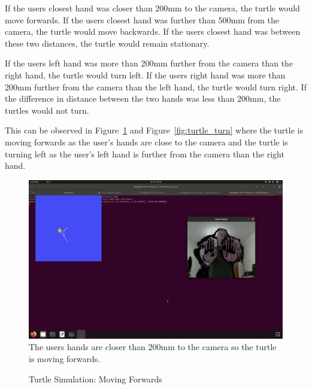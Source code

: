 If the users closest hand was closer than 200mm to the camera, the turtle would move forwards.\newline
If the users closest hand was further than 500mm from the camera, the turtle would move backwards.\newline
If the users closest hand was between these two distances, the turtle would remain stationary.

If the users left hand was more than 200mm further from the camera than the right hand, the turtle would turn left.\newline
If the users right hand was more than 200mm further from the camera than the left hand, the turtle would turn right.\newline
If the difference in distance between the two hands was less than 200mm, the turtles would not turn.

This can be observed in Figure~\ref{fig:turtle_fwd} and Figure~\ref{fig:turtle_turn} where the turtle is moving forwards as the user's hands are close to the camera and the turtle is turning left as the user's left hand is further from the camera than the right hand.

\begin{figure}[!htb]
    \caption{Turtle Simulation: Moving Forwards}
    \includegraphics[width=\textwidth]{Gesture Control Demo Forwards.png}
    \small
    The users hands are closer than 200mm to the camera so the turtle is moving forwards.
    \label{fig:turtle_fwd}
\end{figure}

